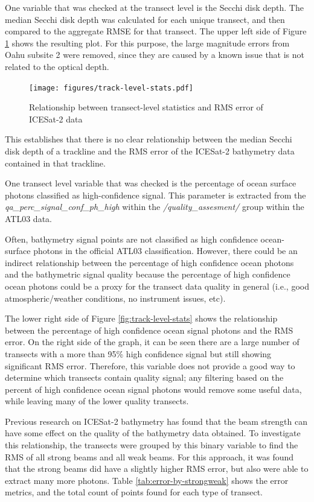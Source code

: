 One variable that was checked at the transect level is the Secchi disk depth. The median Secchi disk depth was calculated for each unique transect, and then compared to the aggregate RMSE for that transect. The upper left side of Figure \ref{fig:transect-rmse-zsd} shows the resulting plot. For this purpose, the large magnitude errors from Oahu subsite 2 were removed, since they are caused by a known issue that is not related to the optical depth.

\begin{figure}[htbp]
    \centering
    \texttt{[image: figures/track-level-stats.pdf]}
    \caption{Relationship between transect-level statistics and RMS error of ICESat-2 data}
    \label{fig:transect-rmse-zsd}
\end{figure}

This establishes that there is no clear relationship between the median Secchi disk depth of a trackline and the RMS error of the ICESat-2 bathymetry data contained in that trackline.

One transect level variable that was checked is the percentage of ocean surface photons classified as high-confidence signal. This parameter is extracted from the \emph{qa\_perc\_signal\_conf\_ph\_high} within the \emph{/quality\_assesment/} group within the ATL03 data.

Often, bathymetry signal points are not classified as high confidence ocean-surface photons in the official ATL03 classification. However, there could be an indirect relationship between the percentage of high confidence ocean photons and the bathymetric signal quality because the percentage of high confidence ocean photons could be a proxy for the transect data quality in general (i.e., good atmospheric/weather conditions, no instrument issues, etc).


The lower right side of Figure \ref{fig:track-level-stats} shows the relationship between the percentage of high confidence ocean signal photons and the RMS error. On the right side of the graph, it can be seen there are a large number of transects with a more than 95\% high confidence signal but still showing significant RMS error. Therefore, this variable does not provide a good way to determine which transects contain quality signal; any filtering based on the percent of high confidence ocean signal photons would remove some useful data, while leaving many of the lower quality transects.

Previous research on ICESat-2 bathymetry has found that the beam strength can have some effect on the quality of the bathymetry data obtained. To investigate this relationship, the transects were grouped by this binary variable to find the RMS of all strong beams and all weak beams. For this approach, it was found that the strong beams did have a slightly higher RMS error, but also were able to extract many more photons. Table \ref{tab:error-by-strongweak} shows the error metrics, and the total count of points found for each type of transect.




